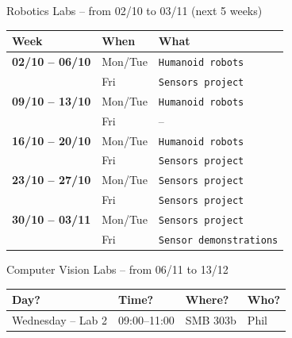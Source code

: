 \documentclass[compress]{beamer}
\begin{document}
\begin{frame}{Robotics Labs -- from 02/10 to 03/11 (next 5 weeks)}

    \begin{tabular}{@{}lll@{}}
        \toprule
        \bf Week           & \bf When      & \bf What \\ \midrule
        \bf 02/10 -- 06/10 & Mon/Tue    & \textcolor{hriSec1Dark}{\tt Humanoid robots}           \\
                           & Fri    & \textcolor{hriSec3Comp}{\tt Sensors project}           \\
        \bf 09/10 -- 13/10 & Mon/Tue    & \textcolor{hriSec1Dark}{\tt Humanoid robots}           \\
                           & Fri    & --           \\
        \bf 16/10 -- 20/10 & Mon/Tue    & \textcolor{hriSec1Dark}{\tt Humanoid robots}           \\
                           & Fri    & \textcolor{hriSec3Comp}{\tt Sensors project}           \\
        \bf 23/10 -- 27/10 & Mon/Tue    & \textcolor{hriSec3Comp}{\tt Sensors project}           \\
                           & Fri    & \textcolor{hriSec3Comp}{\tt Sensors project}           \\
        \bf 30/10 -- 03/11 & Mon/Tue    & \textcolor{hriSec3Comp}{\tt Sensors project}           \\
                           & Fri    & \textcolor{hriSec3Comp}{\tt Sensor demonstrations}           \\
    \end{tabular}


\end{frame}


\begin{frame}{Computer Vision Labs -- from 06/11 to 13/12}

          \begin{tabular}{@{}llll@{}}
                \toprule
                Day?                & Time? & Where?   & Who? \\ \midrule
                Wednesday -- Lab 2 & 09:00--11:00     & SMB 303b  & Phil           \\ \bottomrule
            \end{tabular}


\end{frame}
\end{document}
